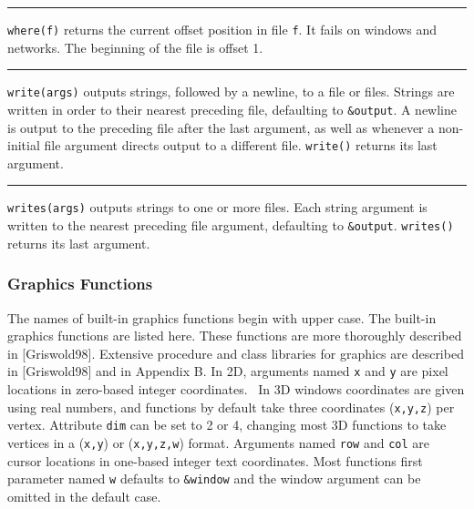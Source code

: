 \bigskip\hrule\vspace{0.1cm}

\noindent
{}\texttt{where(f)} returns the
current offset position in file \texttt{f}. It fails on windows and
networks. The beginning of the file is offset 1.

\bigskip\hrule\vspace{0.1cm}

\noindent
\texttt{write(args)} outputs strings, followed by a newline, to a file
or files. Strings are written in order to their nearest preceding file,
defaulting to \texttt{\&output}. A newline is output to the preceding
file after the last argument, as well as whenever a non-initial file
argument directs output to a different file.
\texttt{write()} returns its last argument.

\bigskip\hrule\vspace{0.1cm}

\noindent
\texttt{writes(args)} outputs strings to one or more files. Each string
argument is written to the nearest preceding file argument, defaulting
to \texttt{\&output}. \texttt{writes()} returns its
last argument.

\subsubsection{Graphics Functions}

The names of built-in graphics functions begin with upper case. The
built-in graphics functions are listed here. These functions are more
thoroughly described in [Griswold98]. Extensive procedure and class
libraries for graphics are described in [Griswold98] and in Appendix B.
In 2D, arguments named \texttt{x} and \texttt{y} are pixel locations in
zero-based integer coordinates. \ In 3D windows coordinates are given
using real numbers, and functions by default take three coordinates
(\texttt{x,y,z}) per vertex. Attribute \texttt{dim} can be set to 2 or
4, changing most 3D functions to take vertices in a (\texttt{x,y}) or
(\texttt{x,y,z,w}) format. Arguments named \texttt{row} and
\texttt{col} are cursor locations in one-based integer text
coordinates. Most functions{\textquotesingle} first parameter named
\texttt{w} defaults to \texttt{\&window} and the window argument can be
omitted in the default case.

